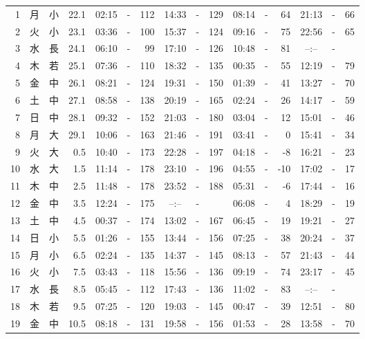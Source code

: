 \documentclass[12pt.a4j]{jsarticle}
\begin{document}
\begin{center}
\begin{table}[ht]
\begin{tabular}{|rc|cr|ccrccr|ccrccr|}
 \hline
 1 & 月 & 小 & 22.1 &  02:15 &-& 112  &  14:33 &-& 129  &   08:14 &-&  64  &   21:13 &-&  66  \\
 2 & 火 & 小 & 23.1 &  03:36 &-& 100  &  15:37 &-& 124  &   09:16 &-&  75  &   22:56 &-&  65  \\
 3 & 水 & 長 & 24.1 &  06:10 &-&  99  &  17:10 &-& 126  &   10:48 &-&  81  &   --:-- &-&     \\
 4 & 木 & 若 & 25.1 &  07:36 &-& 110  &  18:32 &-& 135  &   00:35 &-&  55  &   12:19 &-&  79  \\
 5 & 金 & 中 & 26.1 &  08:21 &-& 124  &  19:31 &-& 150  &   01:39 &-&  41  &   13:27 &-&  70  \\
 6 & 土 & 中 & 27.1 &  08:58 &-& 138  &  20:19 &-& 165  &   02:24 &-&  26  &   14:17 &-&  59  \\
 7 & 日 & 中 & 28.1 &  09:32 &-& 152  &  21:03 &-& 180  &   03:04 &-&  12  &   15:01 &-&  46  \\
 8 & 月 & 大 & 29.1 &  10:06 &-& 163  &  21:46 &-& 191  &   03:41 &-&   0  &   15:41 &-&  34  \\
 9 & 火 & 大 &  0.5 &  10:40 &-& 173  &  22:28 &-& 197  &   04:18 &-&  -8  &   16:21 &-&  23  \\
10 & 水 & 大 &  1.5 &  11:14 &-& 178  &  23:10 &-& 196  &   04:55 &-& -10  &   17:02 &-&  17  \\
11 & 木 & 中 &  2.5 &  11:48 &-& 178  &  23:52 &-& 188  &   05:31 &-&  -6  &   17:44 &-&  16  \\
12 & 金 & 中 &  3.5 &  12:24 &-& 175  &  --:-- &-&     &   06:08 &-&   4  &   18:29 &-&  19  \\
13 & 土 & 中 &  4.5 &  00:37 &-& 174  &  13:02 &-& 167  &   06:45 &-&  19  &   19:21 &-&  27  \\
14 & 日 & 小 &  5.5 &  01:26 &-& 155  &  13:44 &-& 156  &   07:25 &-&  38  &   20:24 &-&  37  \\
15 & 月 & 小 &  6.5 &  02:24 &-& 135  &  14:37 &-& 145  &   08:13 &-&  57  &   21:43 &-&  44  \\
16 & 火 & 小 &  7.5 &  03:43 &-& 118  &  15:56 &-& 136  &   09:19 &-&  74  &   23:17 &-&  45  \\
17 & 水 & 長 &  8.5 &  05:45 &-& 112  &  17:43 &-& 136  &   11:02 &-&  83  &   --:-- &-&     \\
18 & 木 & 若 &  9.5 &  07:25 &-& 120  &  19:03 &-& 145  &   00:47 &-&  39  &   12:51 &-&  80  \\
19 & 金 & 中 & 10.5 &  08:18 &-& 131  &  19:58 &-& 156  &   01:53 &-&  28  &   13:58 &-&  70  \\

\end{tabular}
\end{table}
\end{center}
\end{document}
